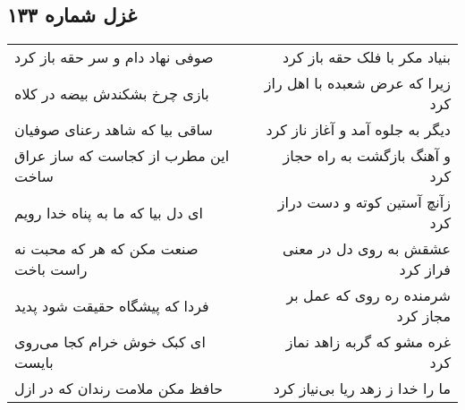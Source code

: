 \begin{center}
\section*{غزل شماره ۱۳۳}
\label{sec:sh133}
\begin{longtable}{l p{0.5cm} r}
صوفی نهاد دام و سر حقه باز کرد
&&
بنیاد مکر با فلک حقه باز کرد
\\
بازی چرخ بشکندش بیضه در کلاه
&&
زیرا که عرض شعبده با اهل راز کرد
\\
ساقی بیا که شاهد رعنای صوفیان
&&
دیگر به جلوه آمد و آغاز ناز کرد
\\
این مطرب از کجاست که ساز عراق ساخت
&&
و آهنگ بازگشت به راه حجاز کرد
\\
ای دل بیا که ما به پناه خدا رویم
&&
زآنچ آستین کوته و دست دراز کرد
\\
صنعت مکن که هر که محبت نه راست باخت
&&
عشقش به روی دل در معنی فراز کرد
\\
فردا که پیشگاه حقیقت شود پدید
&&
شرمنده ره روی که عمل بر مجاز کرد
\\
ای کبک خوش خرام کجا می‌روی بایست
&&
غره مشو که گربه زاهد نماز کرد
\\
حافظ مکن ملامت رندان که در ازل
&&
ما را خدا ز زهد ریا بی‌نیاز کرد
\\
\end{longtable}
\end{center}
